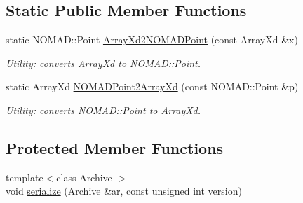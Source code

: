 \subsection*{Static Public Member Functions}
\begin{DoxyCompactItemize}
\item 
static N\-O\-M\-A\-D\-::\-Point \hyperlink{class_c_m_a_d_s_ad025c8a5bc49648b475ad0f7e744de64}{Array\-Xd2\-N\-O\-M\-A\-D\-Point} (const Array\-Xd \&x)
\begin{DoxyCompactList}\small\item\em Utility\-: converts Array\-Xd to N\-O\-M\-A\-D\-::\-Point. \end{DoxyCompactList}\item 
static Array\-Xd \hyperlink{class_c_m_a_d_s_a0ca8523e34599ee52c7d28027dee33f5}{N\-O\-M\-A\-D\-Point2\-Array\-Xd} (const N\-O\-M\-A\-D\-::\-Point \&p)
\begin{DoxyCompactList}\small\item\em Utility\-: converts N\-O\-M\-A\-D\-::\-Point to Array\-Xd. \end{DoxyCompactList}\end{DoxyCompactItemize}
\subsection*{Protected Member Functions}
\begin{DoxyCompactItemize}
\item 
{\footnotesize template$<$class Archive $>$ }\\void \hyperlink{class_c_m_a_d_s_a1bdfd9d99efd11ad0a0e4051d3897903}{serialize} (Archive \&ar, const unsigned int version)
\end{DoxyCompactItemize}
